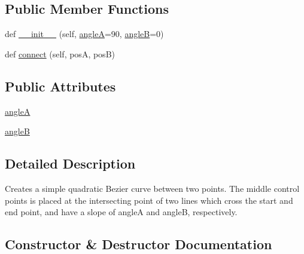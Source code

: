 \subsection*{Public Member Functions}
\begin{DoxyCompactItemize}
\item 
def \hyperlink{classmatplotlib_1_1patches_1_1ConnectionStyle_1_1Angle3_ae43fdb70dc66870e57e2652edd88ad59}{\+\_\+\+\_\+init\+\_\+\+\_\+} (self, \hyperlink{classmatplotlib_1_1patches_1_1ConnectionStyle_1_1Angle3_aadb81f446b43ac68dfb3b5b10e8f7b34}{angleA}=90, \hyperlink{classmatplotlib_1_1patches_1_1ConnectionStyle_1_1Angle3_ae3a168d1d19b4259ec892145c5c14028}{angleB}=0)
\item 
def \hyperlink{classmatplotlib_1_1patches_1_1ConnectionStyle_1_1Angle3_ad67188447229d40973cd5076e9152e1c}{connect} (self, posA, posB)
\end{DoxyCompactItemize}
\subsection*{Public Attributes}
\begin{DoxyCompactItemize}
\item 
\hyperlink{classmatplotlib_1_1patches_1_1ConnectionStyle_1_1Angle3_aadb81f446b43ac68dfb3b5b10e8f7b34}{angleA}
\item 
\hyperlink{classmatplotlib_1_1patches_1_1ConnectionStyle_1_1Angle3_ae3a168d1d19b4259ec892145c5c14028}{angleB}
\end{DoxyCompactItemize}


\subsection{Detailed Description}
\begin{DoxyVerb}Creates a simple quadratic Bezier curve between two
points. The middle control points is placed at the
intersecting point of two lines which cross the start and
end point, and have a slope of angleA and angleB, respectively.
\end{DoxyVerb}
 

\subsection{Constructor \& Destructor Documentation}
\mbox{\label{classmatplotlib_1_1patches_1_1ConnectionStyle_1_1Angle3_ae43fdb70dc66870e57e2652edd88ad59}} 
